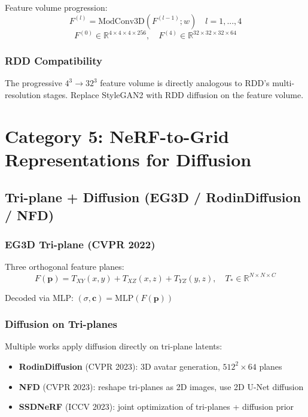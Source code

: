 \documentclass[11pt, a4paper]{article}
\begin{document}
Feature volume progression:
\begin{equation}
    F^{(l)} = \text{ModConv3D}(F^{(l-1)}; w) \quad l = 1,...,4
\end{equation}
\begin{equation}
    F^{(0)} \in \mathbb{R}^{4\times4\times4\times256}, \quad F^{(4)} \in \mathbb{R}^{32\times32\times32\times64}
\end{equation}

\subsubsection{RDD Compatibility}

The progressive $4^3 \to 32^3$ feature volume is directly analogous to RDD's multi-resolution stages. Replace StyleGAN2 with RDD diffusion on the feature volume.

\section{Category 5: NeRF-to-Grid Representations for Diffusion}

\subsection{Tri-plane + Diffusion (EG3D / RodinDiffusion / NFD)}

\subsubsection{EG3D Tri-plane (CVPR 2022)}

Three orthogonal feature planes:
\begin{equation}
    F(\mathbf{p}) = T_{XY}(x,y) + T_{XZ}(x,z) + T_{YZ}(y,z), \quad T_* \in \mathbb{R}^{N \times N \times C}
\end{equation}

Decoded via MLP: $(\sigma, \mathbf{c}) = \text{MLP}(F(\mathbf{p}))$

\subsubsection{Diffusion on Tri-planes}

Multiple works apply diffusion directly on tri-plane latents:
\begin{itemize}
    \item \textbf{RodinDiffusion} (CVPR 2023): 3D avatar generation, $512^2 \times 64$ planes
    \item \textbf{NFD} (CVPR 2023): reshape tri-planes as 2D images, use 2D U-Net diffusion
    \item \textbf{SSDNeRF} (ICCV 2023): joint optimization of tri-planes + diffusion prior
\end{itemize}
\end{document}
